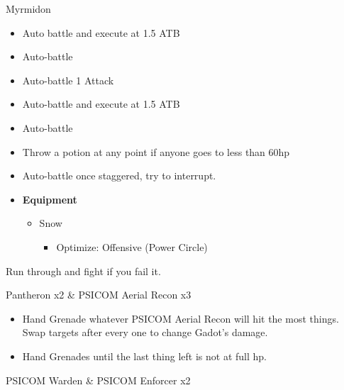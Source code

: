 
	\begin{battle}{Myrmidon}
		\begin{itemize}
			\item Auto battle and execute at 1.5 ATB
			\item Auto-battle
			\item Auto-battle 1 Attack
			\item Auto-battle and execute at 1.5 ATB
			\item Auto-battle
			\item Throw a potion at any point if anyone goes to less than 60hp
			\item Auto-battle once staggered, try to interrupt.
		\end{itemize}

	\end{battle}


	\begin{menu}
		\begin{itemize}
			\item \textbf{Equipment}
			      \begin{itemize}
				      \item Snow
				            \begin{itemize}
					            \item Optimize: Offensive (Power Circle)
				            \end{itemize}
			      \end{itemize}
		\end{itemize}
	\end{menu}

	Run through and fight if you fail it.

	\begin{battle}{Pantheron x2 \& PSICOM Aerial Recon x3}
		\begin{itemize}
			\item Hand Grenade whatever PSICOM Aerial Recon will hit the most things. Swap targets after every one to change Gadot's damage.
			\item Hand Grenades until the last thing left is not at full hp.
		\end{itemize}

	\end{battle}

	\begin{battle}{PSICOM Warden \& PSICOM Enforcer x2}
	\end{battle}


